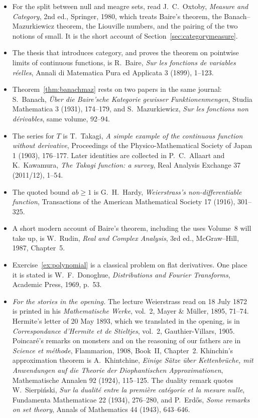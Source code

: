 \begin{itemize}
\item For the split between null and meagre sets, read J.~C.~Oxtoby, \emph{Measure and Category}, 2nd ed., Springer, 1980, which treats Baire's theorem, the Banach--Mazurkiewicz theorem, the Liouville numbers, and the pairing of the two notions of small. It is the short account of Section~\ref{sec:categorymeasure}.
\item The thesis that introduces category, and proves the theorem on pointwise limits of continuous functions, is R.~Baire, \emph{Sur les fonctions de variables r\'eelles}, Annali di Matematica Pura ed Applicata 3 (1899), 1--123.
\item Theorem~\ref{thm:banachmaz} rests on two papers in the same journal: S.~Banach, \emph{\"Uber die Baire'sche Kategorie gewisser Funktionenmengen}, Studia Mathematica 3 (1931), 174--179, and S.~Mazurkiewicz, \emph{Sur les fonctions non d\'erivables}, same volume, 92--94.
\item The series for $T$ is T.~Takagi, \emph{A simple example of the continuous function without derivative}, Proceedings of the Physico-Mathematical Society of Japan 1 (1903), 176--177. Later identities are collected in P.~C.~Allaart and K.~Kawamura, \emph{The Takagi function: a survey}, Real Analysis Exchange 37 (2011/12), 1--54.
\item The quoted bound $ab\ge1$ is G.~H.~Hardy, \emph{Weierstrass's non-differentiable function}, Transactions of the American Mathematical Society 17 (1916), 301--325.
\item A short modern account of Baire's theorem, including the uses Volume~8 will take up, is W.~Rudin, \emph{Real and Complex Analysis}, 3rd ed., McGraw--Hill, 1987, Chapter~5.
\item Exercise~\ref{ex:polynomial} is a classical problem on flat derivatives. One place it is stated is W.~F.~Donoghue, \emph{Distributions and Fourier Transforms}, Academic Press, 1969, p.~53.
\item \emph{For the stories in the opening.} The lecture Weierstrass read on 18 July 1872 is printed in his \emph{Mathematische Werke}, vol.~2, Mayer \& M\"uller, 1895, 71--74. Hermite's letter of 20 May 1893, which we translated in the opening, is in \emph{Correspondance d'Hermite et de Stieltjes}, vol.~2, Gauthier-Villars, 1905. Poincar\'e's remarks on monsters and on the reasoning of our fathers are in \emph{Science et m\'ethode}, Flammarion, 1908, Book~II, Chapter~2. Khinchin's approximation theorem is A.~Khintchine, \emph{Einige S\"atze \"uber Kettenbr\"uche, mit Anwendungen auf die Theorie der Diophantischen Approximationen}, Mathematische Annalen 92 (1924), 115--125. The duality remark quotes W.~Sierpi\'nski, \emph{Sur la dualit\'e entre la premi\`ere cat\'egorie et la mesure nulle}, Fundamenta Mathematicae 22 (1934), 276--280, and P.~Erd\H{o}s, \emph{Some remarks on set theory}, Annals of Mathematics 44 (1943), 643--646.
\end{itemize}
